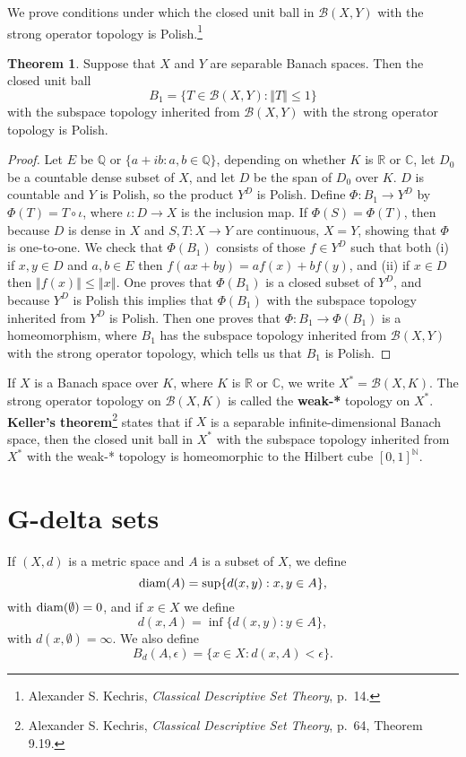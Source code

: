 \documentclass{article}
\newcommand{\diam}{\ensuremath\mathrm{diam}}
\newcommand{\norm}[1]{\left\Vert #1 \right\Vert}
\theoremstyle{definition}
\newtheorem{theorem}{Theorem}
\theoremstyle{definition}
\begin{document}
We  prove conditions under which the closed unit ball in $\mathscr{B}(X,Y)$ with the strong operator topology is Polish.\footnote{Alexander S. Kechris, {\em Classical Descriptive Set Theory}, p.~14.}
 
\begin{theorem}
Suppose that $X$ and $Y$ are separable Banach spaces. Then the closed unit ball
\[
B_1 = \{T \in \mathscr{B}(X,Y): \norm{T} \leq 1\}
\]
with the subspace topology inherited from $\mathscr{B}(X,Y)$ with the strong operator topology is Polish.
\end{theorem} 
\begin{proof}
Let $E$ be $\mathbb{Q}$ or $\{a+ib: a,b \in \mathbb{Q}\}$, depending on whether $K$ is $\mathbb{R}$ or $\mathbb{C}$,
 let $D_0$ be a countable dense subset of $X$, and let
$D$ be the span of $D_0$ over $K$. $D$ is countable and $Y$ is Polish, so the product $Y^D$ is Polish. 
Define $\Phi:B_1 \to Y^D$ by $\Phi(T) = T \circ \iota$, where $\iota:D \to X$ is the inclusion map. 
If $\Phi(S)=\Phi(T)$, then because $D$ is dense in $X$ and $S,T:X \to Y$ are continuous, $X=Y$, showing that $\Phi$ is one-to-one.
We check that
$\Phi(B_1)$ consists of those $f \in Y^D$ such that both (i) if $x,y \in D$ and $a,b \in E$ then $f(ax+by)=af(x)+bf(y)$, and (ii)
if $x \in D$ then $\norm{f(x)} \leq \norm{x}$. One proves that $\Phi(B_1)$ is a closed subset of $Y^D$, and because
$Y^D$ is Polish this implies that $\Phi(B_1)$ with the subspace topology inherited from $Y^D$ is Polish. Then one proves that $\Phi:B_1 \to \Phi(B_1)$ is a
homeomorphism, where $B_1$ has the subspace topology inherited from $\mathscr{B}(X,Y)$ with the strong operator
topology, which tells us that $B_1$ is Polish.
\end{proof}

If $X$ is a Banach space over $K$, where $K$ is $\mathbb{R}$ or $\mathbb{C}$, we write $X^*=\mathscr{B}(X,K)$. The strong
operator topology on $\mathscr{B}(X,K)$ is called the \textbf{weak-*} topology on $X^*$.
\textbf{Keller's theorem}\footnote{Alexander S. Kechris, {\em Classical Descriptive Set Theory}, p.~64, Theorem 9.19.}
 states that if $X$ is a separable infinite-dimensional Banach space, then the closed unit ball in $X^*$ with the subspace
topology inherited from $X^*$ with the weak-* topology is homeomorphic to the Hilbert cube $[0,1]^\mathbb{N}$.

\section{G-delta sets}
If $(X,d)$ is a metric space and $A$ is a subset of $X$, we define
\[
\diam(A) = \sup\{ d(x,y): x,y \in A\},
\]
with $\diam(\emptyset)=0$, and if $x \in X$ we define
\[
d(x,A) = \inf\{d(x,y): y \in A\},
\]
with $d(x,\emptyset)=\infty$. 
We also define
\[
B_d(A,\epsilon) = \{x \in X: d(x,A)<\epsilon\}.
\]
\end{document}
